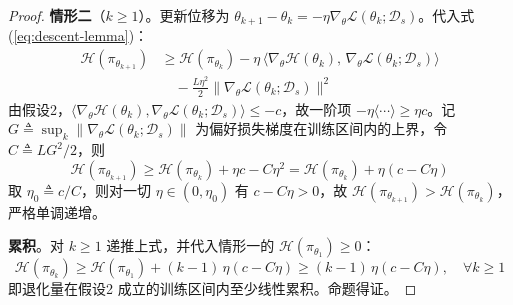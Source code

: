 \documentclass[lettersize,journal]{IEEEtran}
\begin{document}
\begin{proof}
\textbf{情形二}（$k \geq 1$）。更新位移为 $\theta_{k+1} - \theta_k = -\eta \nabla_\theta \mathcal{L}(\theta_k; \mathcal{D}_s)$。代入式(\ref{eq:descent-lemma})：
\begin{equation}
\begin{aligned}
\mathcal{H}(\pi_{\theta_{k+1}}) 
&\geq \mathcal{H}(\pi_{\theta_k}) 
- \eta\,\big\langle\nabla_\theta\mathcal{H}(\theta_k),\, 
\nabla_\theta\mathcal{L}(\theta_k;\mathcal{D}_s)\big\rangle \\
&\quad - \frac{L\eta^2}{2}\big\|\nabla_\theta\mathcal{L}
(\theta_k;\mathcal{D}_s)\big\|^2
\end{aligned}
\end{equation}
由假设2，$\langle\nabla_\theta\mathcal{H}(\theta_k), \nabla_\theta\mathcal{L}(\theta_k;\mathcal{D}_s)\rangle \leq -c$，故一阶项 $-\eta\langle\cdots\rangle \geq \eta c$。记 $G \triangleq \sup_k \|\nabla_\theta\mathcal{L}(\theta_k;\mathcal{D}_s)\|$ 为偏好损失梯度在训练区间内的上界，令 $C \triangleq LG^2/2$，则
\begin{equation}
    \mathcal{H}(\pi_{\theta_{k+1}}) \geq \mathcal{H}(\pi_{\theta_k}) 
    + \eta c - C\eta^2 = \mathcal{H}(\pi_{\theta_k}) + \eta(c - C\eta)
\end{equation}
取 $\eta_0 \triangleq c / C$，则对一切 $\eta \in (0, \eta_0)$ 有 $c - C\eta > 0$，故 $\mathcal{H}(\pi_{\theta_{k+1}}) > \mathcal{H}(\pi_{\theta_k})$，严格单调递增。
 
\textbf{累积}。对 $k \geq 1$ 递推上式，并代入情形一的 $\mathcal{H}(\pi_{\theta_1}) \geq 0$：
\begin{equation}
    \mathcal{H}(\pi_{\theta_k}) \geq \mathcal{H}(\pi_{\theta_1}) 
    + (k-1)\,\eta(c - C\eta) \geq (k-1)\,\eta(c - C\eta), 
    \quad \forall k \geq 1
\end{equation}
即退化量在假设2 成立的训练区间内至少线性累积。命题得证。
\end{proof}
\end{document}
